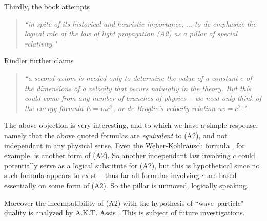 \documentclass[12pt]{amsart}
\theoremstyle{definition}
\theoremstyle{remark}
\begin{document}
Thirdly, the book \cite[pp.8-10, 21-22]{rindler} attempts 
\begin{quote}
\emph{``in spite of its historical and heuristic importance, $\ldots$ to de-emphasize the logical role of the law of light propagation (A2) as a pillar of special relativity."}
\end{quote}
Rindler further claims 
\begin{quote}
\emph{``a second axiom is needed \emph{only} to determine the value of a constant $c$ of the dimensions of a velocity that occurs naturally in the theory. But this could come from any number of branches of physics -- we need only think of the energy formula $E=mc^2$, or de Broglie's velocity relation $u v =c^2$." }
\end{quote}
The above objection is very interesting, and to which we have a simple response, namely that the above quoted formulas are \emph{equivalent} to (A2), and not independant in any physical sense. Even the Weber-Kohlrausch formula \cite{awk}, for example, is another form of (A2). So another independant law involving $c$ could potentially serve as a logical substitute for (A2), but this is hypothetical since no such formula appears to exist -- thus far all formulas involving $c$ are based essentially on some form of (A2). So the pillar is unmoved, logically speaking.  

Moreover the incompatibility of (A2) with the hypothesis of ``wave--particle" duality is analyzed by A.K.T. Assis \cite[\S 7.2.4, pp.133]{assis1999relational}. This is subject of future investigations.







\end{document}
